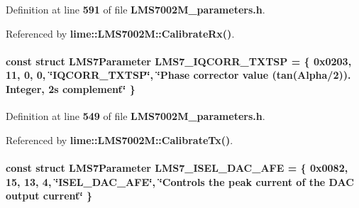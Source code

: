 Definition at line {\bf 591} of file {\bf L\+M\+S7002\+M\+\_\+parameters.\+h}.



Referenced by {\bf lime\+::\+L\+M\+S7002\+M\+::\+Calibrate\+Rx()}.

\paragraph[{L\+M\+S7\+\_\+\+I\+Q\+C\+O\+R\+R\+\_\+\+T\+X\+T\+SP}]{\setlength{\rightskip}{0pt plus 5cm}const struct {\bf L\+M\+S7\+Parameter} L\+M\+S7\+\_\+\+I\+Q\+C\+O\+R\+R\+\_\+\+T\+X\+T\+SP = \{ 0x0203, 11, 0, 0, \char`\"{}\+I\+Q\+C\+O\+R\+R\+\_\+\+T\+X\+T\+S\+P\char`\"{}, \char`\"{}\+Phase corrector value (tan(\+Alpha/2)). Integer, 2\textquotesingle{}s complement\char`\"{} \}\hspace{0.3cm}{\ttfamily [static]}}\label{LMS7002M__parameters_8h_a0ef180a2447759af5846431a039e3afb}


Definition at line {\bf 549} of file {\bf L\+M\+S7002\+M\+\_\+parameters.\+h}.



Referenced by {\bf lime\+::\+L\+M\+S7002\+M\+::\+Calibrate\+Tx()}.

\paragraph[{L\+M\+S7\+\_\+\+I\+S\+E\+L\+\_\+\+D\+A\+C\+\_\+\+A\+FE}]{\setlength{\rightskip}{0pt plus 5cm}const struct {\bf L\+M\+S7\+Parameter} L\+M\+S7\+\_\+\+I\+S\+E\+L\+\_\+\+D\+A\+C\+\_\+\+A\+FE = \{ 0x0082, 15, 13, 4, \char`\"{}\+I\+S\+E\+L\+\_\+\+D\+A\+C\+\_\+\+A\+F\+E\char`\"{}, \char`\"{}\+Controls the peak current of the D\+A\+C output current\char`\"{} \}\hspace{0.3cm}{\ttfamily [static]}}\label{LMS7002M__parameters_8h_a1973f23002c3cad8e394fcaffd543130}


